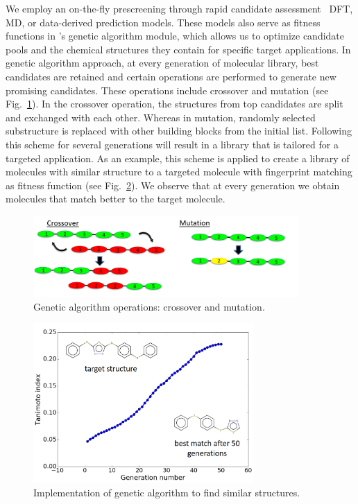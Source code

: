 We employ an on-the-fly prescreening through rapid candidate assessment \via\ DFT, MD, or data-derived prediction models. These models also serve as fitness functions in \chemlg 's genetic algorithm module, which allows us to optimize candidate pools and the chemical structures they contain for specific target applications. In genetic algorithm approach, at every generation of molecular library, best candidates are retained and certain operations are performed to generate new promising candidates. These operations include crossover and mutation (see Fig.\ \ref{fig:GA}). In the crossover operation, the structures from top candidates are split and exchanged with each other. Whereas in mutation, randomly selected substructure is replaced with other building blocks from the initial list. Following this scheme for several generations will result in a library that is tailored for a targeted application. As an example, this scheme is applied to create a library of molecules with similar structure to a targeted molecule with fingerprint matching as fitness function (see Fig.\ \ref{fig:GA_example}). We observe that at every generation we obtain molecules that match better to the target molecule. 


\begin{figure}[htbp] 
	\centering
	\includegraphics[width=0.9\textwidth]{Chapter-4/Figures/GA.png}
	\caption{Genetic algorithm operations: crossover and mutation.} 
	\label{fig:GA} 
\end{figure}  


\begin{figure}[htbp] 
	\centering
	\includegraphics[width=0.75\textwidth]{Chapter-4/Figures/GA_example.jpg}
	\caption{Implementation of genetic algorithm to find similar structures.} 
	\label{fig:GA_example} 
\end{figure}  


